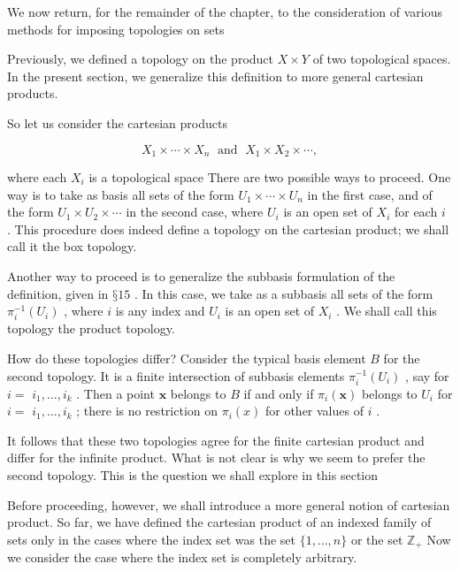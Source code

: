 We now return, for the remainder of the chapter, to the consideration of various methods for imposing topologies on sets

Previously, we defined a topology on the product \(X \times  Y\) of two topological spaces. In the present section, we generalize this definition to more general cartesian products.

So let us consider the cartesian products

\[
{X}_{1} \times  \cdots  \times  {X}_{n}\;\text{ and }\;{X}_{1} \times  {X}_{2} \times  \cdots ,
\]

where each \({X}_{i}\) is a topological space There are two possible ways to proceed. One way is to take as basis all sets of the form \({U}_{1} \times  \cdots  \times  {U}_{n}\) in the first case, and of the form \({U}_{1} \times  {U}_{2} \times  \cdots\) in the second case, where \({U}_{i}\) is an open set of \({X}_{i}\) for each \(i\) . This procedure does indeed define a topology on the cartesian product; we shall call it the box topology.

Another way to proceed is to generalize the subbasis formulation of the definition, given in \(§{15}\) . In this case, we take as a subbasis all sets of the form \({\pi }_{i}^{-1}\left( {U}_{i}\right)\) , where \(i\) is any index and \({U}_{i}\) is an open set of \({X}_{i}\) . We shall call this topology the product topology.

How do these topologies differ? Consider the typical basis element \(B\) for the second topology. It is a finite intersection of subbasis elements \({\pi }_{i}^{-1}\left( {U}_{i}\right)\) , say for \(i =\)  \({i}_{1},\ldots ,{i}_{k}\) . Then a point \(\mathbf{x}\) belongs to \(B\) if and only if \({\pi }_{i}\left( \mathbf{x}\right)\) belongs to \({U}_{i}\) for \(i =\)  \({i}_{1},\ldots ,{i}_{k}\) ; there is no restriction on \({\pi }_{i}\left( x\right)\) for other values of \(i\) .

It follows that these two topologies agree for the finite cartesian product and differ for the infinite product. What is not clear is why we seem to prefer the second topology. This is the question we shall explore in this section

Before proceeding, however, we shall introduce a more general notion of cartesian product. So far, we have defined the cartesian product of an indexed family of sets only in the cases where the index set was the set \(\{ 1,\ldots ,n\}\) or the set \({\mathbb{Z}}_{ + }\) Now we consider the case where the index set is completely arbitrary.

